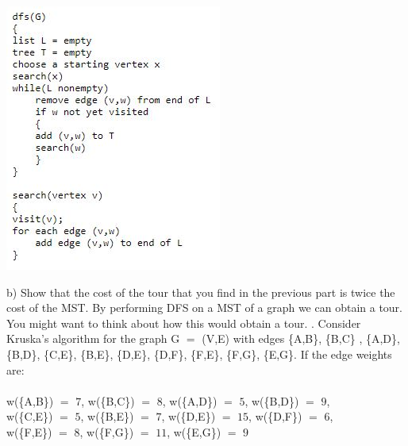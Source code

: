 \documentclass[12pt]{article}
\begin{document}
\noindent \centerline{\includegraphics[scale = .75]{dfs.jpg}}
b) Show that the cost of the tour that you find in the previous part is twice the cost of the
MST. By performing DFS on a MST of a graph we can obtain a tour. You might want to think about 
how this would obtain a tour.
\newpage
{}. Consider Kruska's algorithm for the graph G $=$ (V,E) with edges \{A,B\}, \{B,C\}
, \{A,D\}, \{B,D\}, \{C,E\}, \{B,E\}, \{D,E\}, \{D,F\}, \{F,E\}, \{F,G\}, \{E,G\}. 
If the edge weights are:\\\\
w(\{A,B\}) $=$ $7$, w(\{B,C\}) $=$ $8$, w(\{A,D\}) $=$ $5$, w(\{B,D\}) $=$ $9$,\\
w(\{C,E\}) $=$ $5$, w(\{B,E\}) $=$ $7$, w(\{D,E\}) $=$ $15$, w(\{D,F\}) $=$ $6$,\\
w(\{F,E\}) $=$ $8$, w(\{F,G\}) $=$ $11$, w(\{E,G\}) $=$ $9$
\\\\\\\\\\\\\\\\\\\\\\\\\\\\\\\\\\\\\\\\\\\\
\end{document}
